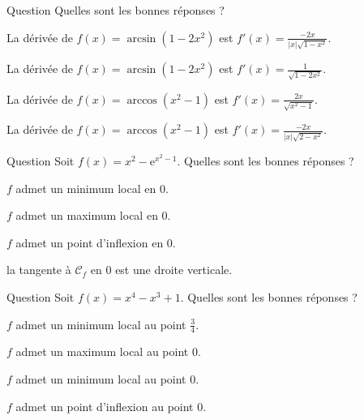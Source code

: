 \begin{multi}[multiple,feedback=
{On applique les règles
\[(\arcsin u)'=\frac{u'}{\sqrt{1-u^2}}\mbox{ et }(\arccos v)'=\frac{-v'}{\sqrt{1-v^2}}.\]
Avec \(u=1-2x^2\) et \(v=x^2-1\), on obtient :
\[(\arcsin (1-2x^2))'=\frac{-2x}{|x|\sqrt{1-x^2}}\mbox{ et }(\arccos (x^2-1))'=\frac{-2x}{|x|\sqrt{2-x^2}}.\]
}]{Question}
Quelles sont les bonnes réponses ?

    \item* La dérivée de \(f(x)=\arcsin (1-2x^2)\) est \(\displaystyle f'(x)=\frac{-2x}{|x|\sqrt{1-x^2}}\).
    \item La dérivée de \(f(x)=\arcsin (1-2x^2)\) est \(\displaystyle f'(x)=\frac{1}{\sqrt{1-2x^2}}\).
    \item La dérivée de \(f(x)=\arccos (x^2-1)\) est \(\displaystyle f'(x)=\frac{2x}{\sqrt{x^2-1}}\).
    \item* La dérivée de \(f(x)=\arccos (x^2-1)\) est \(\displaystyle f'(x)=\frac{-2x}{|x|\sqrt{2-x^2}}\).
\end{multi}


\begin{multi}[multiple,feedback=
{On calcule \(f'(x)=2x-2x\mathrm{e}^{x^2-1}\) et \(f''(x)=2-2(1+2x^2)\mathrm{e}^{x^2-1}\). Ensuite, on vérifie que
\[f'(x)=0\mbox{ et }f''(0)=2-2\mathrm{e}^{-1}>0.\]
Donc \(f\) admet un minimum local en \(0\) et la tangente à \(\mathcal{C}_f\) en \(0\) est une droite horizontale.
}]{Question}
Soit \(\displaystyle f(x)=x^2-\mathrm{e}^{x^2-1}\). Quelles sont les bonnes réponses ?

    \item* \(f\) admet un minimum local en \(0\).
    \item \(f\) admet un maximum local en \(0\).
    \item \(f\) admet un point d'inflexion en \(0\).
    \item la tangente à \(\mathcal{C}_f\) en \(0\) est une droite verticale.
\end{multi}


\begin{multi}[multiple,feedback=
{On a \(f'\left(\frac{3}{4}\right)=0\) et \(f''\left(\frac{3}{4}\right)>0\). Donc \(f\) admet un minimum au point \(\displaystyle \frac{3}{4}\). On vérifie aussi que \(f''\) s'annule en \(0\) en changeant de signe. Donc \(f\) admet un point d'inflexion au point \(0\).
}]{Question}
Soit \(\displaystyle f(x)=x^4-x^3+1\). Quelles sont les bonnes réponses ?

    \item* \(f\) admet un minimum local au point \(\displaystyle \frac{3}{4}\).
    \item \(f\) admet un maximum local au point \(0\).
    \item \(f\) admet un minimum local au point \(0\).
    \item* \(f\) admet un point d'inflexion au point \(0\).
\end{multi}


